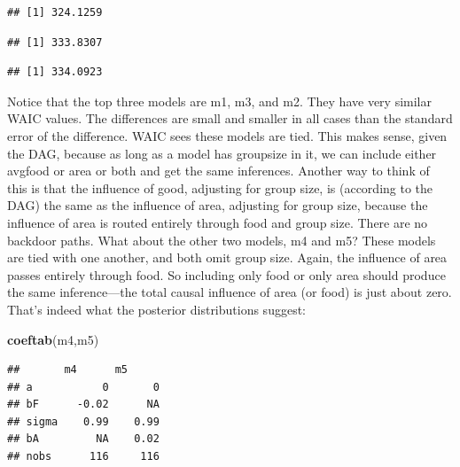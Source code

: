 \documentclass[
]{article}
\newenvironment{Shaded}{\begin{snugshade}}{\end{snugshade}}
\newcommand{\KeywordTok}[1]{\textcolor[rgb]{0.13,0.29,0.53}{\textbf{#1}}}
\newcommand{\NormalTok}[1]{#1}
\newcommand{\OperatorTok}[1]{\textcolor[rgb]{0.81,0.36,0.00}{\textbf{#1}}}
\begin{document}
\begin{verbatim}
## [1] 324.1259
\end{verbatim}

\begin{Shaded}
\end{Shaded}

\begin{verbatim}
## [1] 333.8307
\end{verbatim}

\begin{Shaded}
\end{Shaded}

\begin{verbatim}
## [1] 334.0923
\end{verbatim}

Notice that the top three models are m1, m3, and m2. They have very
similar WAIC values. The differences are small and smaller in all cases
than the standard error of the difference. WAIC sees these models are
tied. This makes sense, given the DAG, because as long as a model has
groupsize in it, we can include either avgfood or area or both and get
the same inferences. Another way to think of this is that the influence
of good, adjusting for group size, is (according to the DAG) the same as
the influence of area, adjusting for group size, because the influence
of area is routed entirely through food and group size. There are no
backdoor paths. What about the other two models, m4 and m5? These models
are tied with one another, and both omit group size. Again, the
influence of area passes entirely through food. So including only food
or only area should produce the same inference---the total causal
influence of area (or food) is just about zero. That's indeed what the
posterior distributions suggest:

\begin{Shaded}
\begin{Highlighting}[]
\KeywordTok{coeftab}\NormalTok{(m4,m5)}
\end{Highlighting}
\end{Shaded}

\begin{verbatim}
##       m4      m5     
## a           0       0
## bF      -0.02      NA
## sigma    0.99    0.99
## bA         NA    0.02
## nobs      116     116
\end{verbatim}
\end{document}

